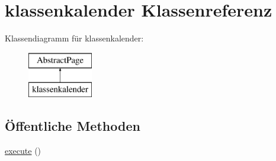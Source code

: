 \hypertarget{classklassenkalender}{}\section{klassenkalender Klassenreferenz}
\label{classklassenkalender}
Klassendiagramm für klassenkalender\+:\begin{figure}[H]
\begin{center}
\leavevmode
\includegraphics[height=2.000000cm]{classklassenkalender}
\end{center}
\end{figure}
\subsection*{Öffentliche Methoden}
\begin{DoxyCompactItemize}
\item 
\mbox{\hyperlink{classklassenkalender_a6875035fc1f29e41d3e98dbf295d97b0}{execute}} ()
\end{DoxyCompactItemize}
